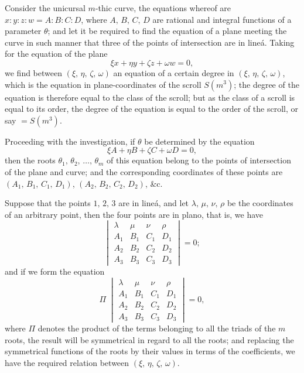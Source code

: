 \documentclass[11pt,a4paper]{article}
\begin{document}
Consider the unicursal $m$-thic curve, the equations whereof are $x : y : z : w = A : B : C : D$, where $A,\,B,\,C,\,D$ are rational and integral functions of a parameter $\theta$; and let it be required to find the equation of a plane meeting the curve in such manner that three of the points of intersection are in line\'a. Taking for the equation of the plane
\[
\xi x + \eta y + \zeta z + \omega w = 0,
\]
we find between $(\xi,\,\eta,\,\zeta,\,\omega)$ an equation of a certain degree in $(\xi,\,\eta,\,\zeta,\,\omega)$, which is the equation in plane-coordinates of the scroll $S(m^3)$; the degree of the equation is therefore equal to the class of the scroll; but as the class of a scroll is equal to its order, the degree of the equation is equal to the order of the scroll, or say $= S(m^3)$.

\medskip

Proceeding with the investigation, if $\theta$ be determined by the equation
\[
\xi A + \eta B + \zeta C + \omega D = 0,
\]
then the roots $\theta_1,\,\theta_2,\,\ldots,\,\theta_m$ of this equation belong to the points of intersection of the plane and curve; and the corresponding coordinates of these points are $(A_1,\,B_1,\,C_1,\,D_1)$, $(A_2,\,B_2,\,C_2,\,D_2)$, \&c.

\medskip

Suppose that the points $1,\,2,\,3$ are in line\'a, and let $\lambda,\,\mu,\,\nu,\,\rho$ be the coordinates of an arbitrary point, then the four points are in plano, that is, we have
\[
\begin{vmatrix}
\lambda & \mu & \nu & \rho\\
A_1 & B_1 & C_1 & D_1\\
A_2 & B_2 & C_2 & D_2\\
A_3 & B_3 & C_3 & D_3
\end{vmatrix} = 0;
\]
and if we form the equation
\[
\Pi\;
\begin{vmatrix}
\lambda & \mu & \nu & \rho\\
A_1 & B_1 & C_1 & D_1\\
A_2 & B_2 & C_2 & D_2\\
A_3 & B_3 & C_3 & D_3
\end{vmatrix} = 0,
\]
where $\Pi$ denotes the product of the terms belonging to all the triads of the $m$ roots, the result will be symmetrical in regard to all the roots; and replacing the symmetrical functions of the roots by their values in terms of the coefficients, we have the required relation between $(\xi,\,\eta,\,\zeta,\,\omega)$.
\end{document}
